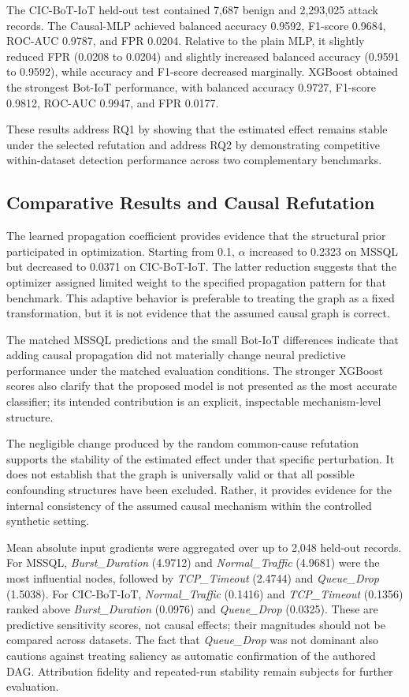 \documentclass[journal]{IEEEtran}
\begin{document}
The CIC-BoT-IoT held-out test contained 7,687 benign and 2,293,025 attack
records. The Causal-MLP achieved balanced accuracy 0.9592, F1-score 0.9684,
ROC-AUC 0.9787, and FPR 0.0204. Relative to the plain MLP, it slightly reduced
FPR (0.0208 to 0.0204) and slightly increased balanced accuracy (0.9591 to
0.9592), while accuracy and F1-score decreased marginally. XGBoost obtained
the strongest Bot-IoT performance, with balanced accuracy 0.9727, F1-score
0.9812, ROC-AUC 0.9947, and FPR 0.0177.

These results address RQ1 by showing that the estimated effect remains stable
under the selected refutation and address RQ2 by demonstrating competitive
within-dataset detection performance across two complementary benchmarks.

\subsection{Comparative Results and Causal Refutation}
\label{subsec:comparative_refutation}

The learned propagation coefficient provides evidence that the structural
prior participated in optimization. Starting from 0.1, $\alpha$ increased to
0.2323 on MSSQL but decreased to 0.0371 on CIC-BoT-IoT. The latter reduction
suggests that the optimizer assigned limited weight to the specified
propagation pattern for that benchmark. This adaptive behavior is preferable
to treating the graph as a fixed transformation, but it is not evidence that
the assumed causal graph is correct.

The matched MSSQL predictions and the small Bot-IoT differences indicate that
adding causal propagation did not materially change neural predictive
performance under the matched evaluation conditions. The stronger XGBoost
scores also clarify that the proposed model is not presented as the most
accurate classifier; its intended contribution is an explicit, inspectable
mechanism-level structure.

The negligible change produced by the random common-cause refutation supports
the stability of the estimated effect under that specific perturbation. It
does not establish that the graph is universally valid or that all possible
confounding structures have been excluded. Rather, it provides evidence for
the internal consistency of the assumed causal mechanism within the
controlled synthetic setting.

Mean absolute input gradients were aggregated over up to 2,048 held-out
records. For MSSQL, \textit{Burst\_Duration} (4.9712) and
\textit{Normal\_Traffic} (4.9681) were the most influential nodes, followed
by \textit{TCP\_Timeout} (2.4744) and \textit{Queue\_Drop} (1.5038). For
CIC-BoT-IoT, \textit{Normal\_Traffic} (0.1416) and \textit{TCP\_Timeout}
(0.1356) ranked above \textit{Burst\_Duration} (0.0976) and
\textit{Queue\_Drop} (0.0325). These are predictive sensitivity scores, not
causal effects; their magnitudes should not be compared across datasets. The
fact that \textit{Queue\_Drop} was not dominant also cautions against treating
saliency as automatic confirmation of the authored DAG. Attribution fidelity
and repeated-run stability remain subjects for further evaluation.
\end{document}
